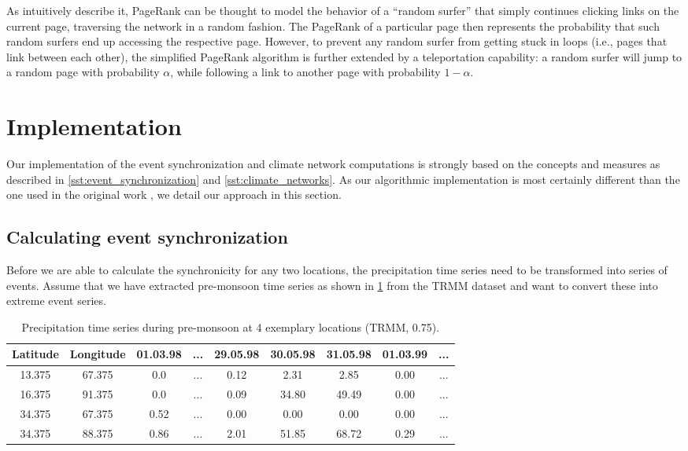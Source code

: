 As \citet{Page.1999} intuitively describe it, PageRank can be thought to model the behavior of a ``random surfer'' that simply continues clicking links on the current page, traversing the network in a random fashion. The PageRank of a particular page then represents the probability that such random surfers end up accessing the respective page. However, to prevent any random surfer from getting stuck in loops (i.e., pages that link between each other), the simplified PageRank algorithm is further extended by a teleportation capability: a random surfer will jump to a random page with probability $\alpha$, while following a link to another page with probability $1-\alpha$.


\clearpage
\section{Implementation}
\label{st:event_sync_implementation}
Our implementation of the event synchronization and climate network computations is strongly based on the concepts and measures as described in \cref{sst:event_synchronization} and \cref{sst:climate_networks}. As our algorithmic implementation is most certainly different than the one used in the original work \citep{Stolbova.2015}, we detail our approach in this section.

\subsection{Calculating event synchronization}
\label{sst:event_sync_calculation}
Before we are able to calculate the synchronicity for any two locations, the precipitation time series need to be transformed into series of events. Assume that we have extracted pre-monsoon time series as shown in \cref{tab:example_rainfall_ts} from the TRMM dataset and want to convert these into extreme event series.

\begin{table}[h]
  \centering
  \begin{tabular}{ |c|c|ccccccc| }
    \hline
    Latitude & Longitude & 01.03.98 & ... & 29.05.98 & 30.05.98 & 31.05.98 & 01.03.99 & ...\\
    \hline
    13.375 & 67.375 & 0.0  & ... & 0.12 & 2.31  & 2.85  & 0.00 & ... \\
    16.375 & 91.375 & 0.0  & ... & 0.09 & 34.80 & 49.49 & 0.00 & ... \\
    34.375 & 67.375 & 0.52 & ... & 0.00 & 0.00  & 0.00  & 0.00 & ... \\
    34.375 & 88.375 & 0.86 & ... & 2.01 & 51.85 & 68.72 & 0.29 & ... \\
    \hline
  \end{tabular}
  \caption{Precipitation time series during pre-monsoon at 4 exemplary locations (TRMM, 0.75\degree).}
  \label{tab:example_rainfall_ts}
\end{table}

